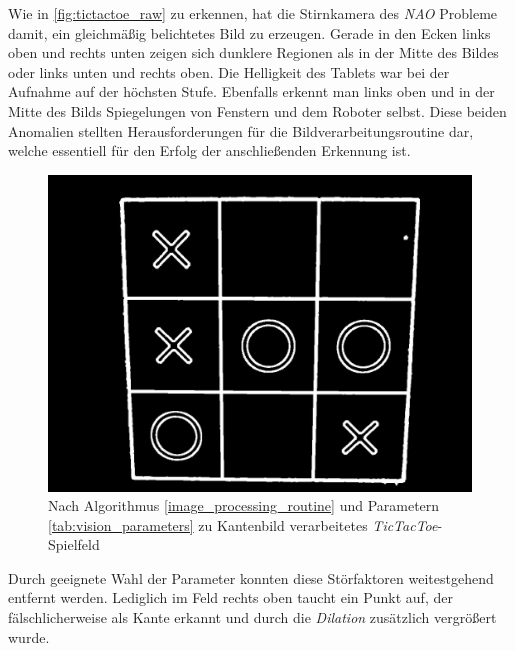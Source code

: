 Wie in \ref{fig:tictactoe_raw} zu erkennen, hat die Stirnkamera des \textit{NAO} Probleme damit, ein gleichmäßig belichtetes Bild zu erzeugen. Gerade in den Ecken links oben und rechts unten zeigen sich dunklere Regionen als in der Mitte des Bildes oder links unten und rechts oben. Die Helligkeit des Tablets war bei der Aufnahme auf der höchsten Stufe. Ebenfalls erkennt man links oben und in der Mitte des Bilds Spiegelungen von Fenstern und dem Roboter selbst. Diese beiden Anomalien stellten Herausforderungen für die Bildverarbeitungsroutine dar, welche essentiell für den Erfolg der anschließenden Erkennung ist.
\begin{figure}[!htbp]
    \centering
    \includegraphics[width=12cm]{bilder/tictactoe_edges.png}
    \caption[\textit{TicTacToe} Kantenbild]{Nach Algorithmus \vref{image_processing_routine} und Parametern \ref{tab:vision_parameters} zu Kantenbild verarbeitetes \textit{TicTacToe}-Spielfeld}
    \label{fig:tictactoe_edges}
\end{figure}

Durch geeignete Wahl der Parameter konnten diese Störfaktoren weitestgehend entfernt werden. Lediglich im Feld rechts oben taucht ein Punkt auf, der fälschlicherweise als Kante erkannt und durch die \textit{Dilation} zusätzlich vergrößert wurde. 

